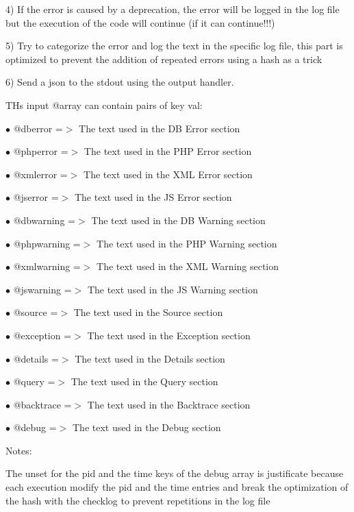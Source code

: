 \documentclass[a4paper]{article}
\begin{document}
4) If the error is caused by a deprecation, the error will be logged in the log file
but the execution of the code will continue (if it can continue!!!)

5) Try to categorize the error and log the text in the specific log file, this part
is optimized to prevent the addition of repeated errors using a hash as a trick

6) Send a json to the stdout using the output handler.

THs input @array can contain pairs of key val:

\begin{compactitem}
\item[\color{myblue}$\bullet$] @dberror    =$>$ The text used in the DB Error section
\item[\color{myblue}$\bullet$] @phperror   =$>$ The text used in the PHP Error section
\item[\color{myblue}$\bullet$] @xmlerror   =$>$ The text used in the XML Error section
\item[\color{myblue}$\bullet$] @jserror    =$>$ The text used in the JS Error section
\item[\color{myblue}$\bullet$] @dbwarning  =$>$ The text used in the DB Warning section
\item[\color{myblue}$\bullet$] @phpwarning =$>$ The text used in the PHP Warning section
\item[\color{myblue}$\bullet$] @xmlwarning =$>$ The text used in the XML Warning section
\item[\color{myblue}$\bullet$] @jswarning  =$>$ The text used in the JS Warning section
\item[\color{myblue}$\bullet$] @source     =$>$ The text used in the Source section
\item[\color{myblue}$\bullet$] @exception  =$>$ The text used in the Exception section
\item[\color{myblue}$\bullet$] @details    =$>$ The text used in the Details section
\item[\color{myblue}$\bullet$] @query      =$>$ The text used in the Query section
\item[\color{myblue}$\bullet$] @backtrace  =$>$ The text used in the Backtrace section
\item[\color{myblue}$\bullet$] @debug      =$>$ The text used in the Debug section
\end{compactitem}

Notes:

The unset for the pid and the time keys of the debug array is justificate
because each execution modify the pid and the time entries and break the
optimization of the hash with the checklog to prevent repetitions in the
log file
\end{document}
